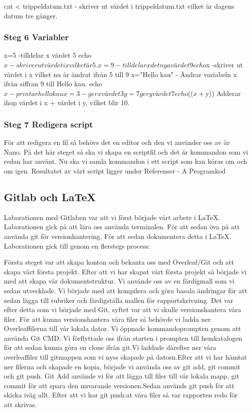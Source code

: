 \documentclass[12pt, a4paper, openright]{article}
\begin{document}
cat  < trippeldatum.txt - skriver ut värdet i trippeldatum.txt vilket är dagens datum tre gånger.

\subsubsection{Steg 6 Variabler}

x=5 -tilldelar x värdet 5
echo $x - skriver ut värdet i x vilket är 5.
x=9 - tilldelar x det nya värdet 9
echo $x -skriver ut värdet i x vilket nu är ändrat ifrån 5 till 9
x="Hello kau" - Ändrar variabeln x ifrån siffran 9 till Hello kau.
echo $x - printar hello kau
x=3 - ger x värdet 3
y=7 ger y värdet 7
echo $(($x + $y)) Adderar ihop värdet i x + värdet i y, vilket blir 10.

\subsubsection{Steg 7 Redigera script}

För att redigera en fil så behövs det en editor och den vi använder oss av är Nano.
På det här steget så ska vi skapa en scriptfil och det är kommandon som vi redan har använt. Nu ska vi samla kommandon i ett script som kan köras om och om igen.
Resultatet av vårt script ligger under Referenser - A Programkod

\newpage

\subsection{Gitlab och LaTeX}
Laborationen med Gitlaben var att vi först började vårt arbete i LaTeX. Laborationen gick på att lära oss använda terminalen. För att sedan öva på att använda git för versionhantering. För att sedan dokumentera detta i LaTeX. Laborationen gick till genom en flerstegs process:

Första steget var att skapa konton och bekanta oss med Overleaf/Git och att skapa vårt första projekt. Efter att vi har skapat vårt första projekt så började vi med att skapa vår dokumentstruktur. Vi använde oss av en färdigmall som vi sedan utvecklade. Vi började med att kompilera och göra basala ändringar för att sedan lägga till rubriker och färdigställa mallen för rapportskrivning. Det var efter detta som vi började med Git, syftet var att vi skulle versionshantera våra filer. För att kunna versionshantera våra filer så behövde vi ladda ner Overleaffilerna till vår lokala dator. Vi öppnade kommandoprompten genom att använda Git CMD. Vi förflyttade oss ifrån starten i prompten till hemkatalogen för att sedan kunna göra en clone ifrån git.Vi laddade därefter ner våra overleaffiler till gitmappen som vi nyss skapade på datorn.Efter att vi har hämtat ner filerna och skapade en kopia, började vi använda oss av git add, git commit och git push. Git Add använde vi för att lägga till filer till vår lokala mapp, git commit för att spara den nuvarande versionen.Sedan används git push för att skicka iväg allt. Efter att vi har git push:at våra filer så var rapporten redo för att skrivas.
\end{document}
